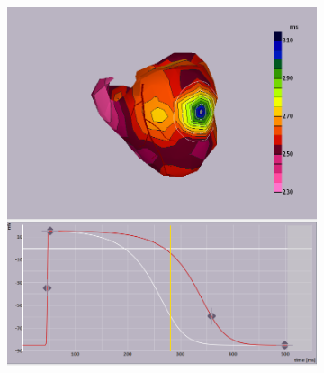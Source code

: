 \documentclass[12pt]{article}
\begin{document}
\begin{figure}[H]
\begin{subfigure}{0.45\textwidth}
	\caption{}
	\label{APD:epi2}
	\end{subfigure}
	\begin{subfigure}{0.45\textwidth}
		\centering
		\includegraphics[width = \textwidth]{Figures/EpiChangedADP_1.png}
		\caption{}
		\label{APD:epichanged}
	\end{subfigure}

	\caption{}
	\label{fig:APD}
\end{figure}
\end{document}
